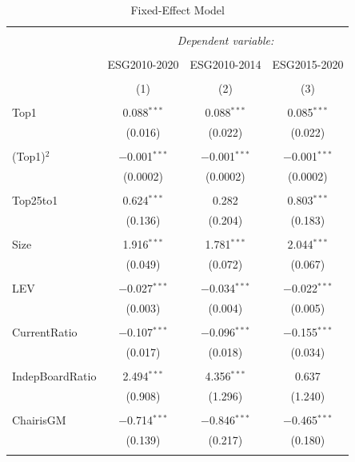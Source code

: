 \documentclass[
  12pt,
]{article}
\begin{document}
\begin{table}[!htbp] \centering \footnotesize
  \caption{Fixed-Effect Model} 
  \label{} 
\begin{tabular}{@{\extracolsep{5pt}}lccc} 
\\[-1.8ex]\hline 
\hline \\[-1.8ex] 
 & \multicolumn{3}{c}{\textit{Dependent variable:}} \\ 
\cline{2-4} 
\\[-1.8ex] & ESG2010-2020 & ESG2010-2014 & ESG2015-2020 \\ 
\\[-1.8ex] & (1) & (2) & (3)\\ 
\hline \\[-1.8ex] 
 Top1 & 0.088$^{***}$ & 0.088$^{***}$ & 0.085$^{***}$ \\ 
  & (0.016) & (0.022) & (0.022) \\ 
  & & & \\ 
 (Top1)$^2$ & $-$0.001$^{***}$ & $-$0.001$^{***}$ & $-$0.001$^{***}$ \\ 
  & (0.0002) & (0.0002) & (0.0002) \\ 
  & & & \\ 
 Top25to1 & 0.624$^{***}$ & 0.282 & 0.803$^{***}$ \\ 
  & (0.136) & (0.204) & (0.183) \\ 
  & & & \\ 
 Size & 1.916$^{***}$ & 1.781$^{***}$ & 2.044$^{***}$ \\ 
  & (0.049) & (0.072) & (0.067) \\ 
  & & & \\ 
 LEV & $-$0.027$^{***}$ & $-$0.034$^{***}$ & $-$0.022$^{***}$ \\ 
  & (0.003) & (0.004) & (0.005) \\ 
  & & & \\ 
 CurrentRatio & $-$0.107$^{***}$ & $-$0.096$^{***}$ & $-$0.155$^{***}$ \\ 
  & (0.017) & (0.018) & (0.034) \\ 
  & & & \\ 
 IndepBoardRatio & 2.494$^{***}$ & 4.356$^{***}$ & 0.637 \\ 
  & (0.908) & (1.296) & (1.240) \\ 
  & & & \\ 
 ChairisGM & $-$0.714$^{***}$ & $-$0.846$^{***}$ & $-$0.465$^{***}$ \\ 
  & (0.139) & (0.217) & (0.180) \\ 
  & & & \\ 

\end{tabular}
\end{table}
\end{document}
